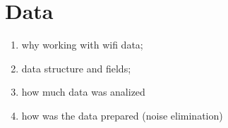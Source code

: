 \chapter{Data}
\begin{enumerate}
\item why working with wifi data;
\item data structure and fields;
\item how much data was analized
\item how was the data prepared (noise elimination)
\end{enumerate}